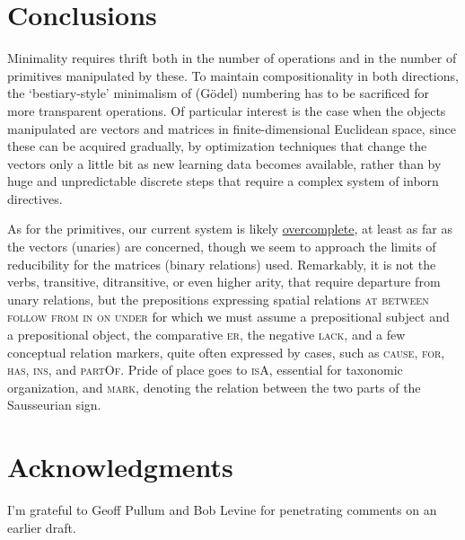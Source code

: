 \documentclass[output=paper,colorlinks=true,citecolor=brown]{langscibook}
\begin{document}
\section{Conclusions}

Minimality requires thrift both in the number of operations and in the number
of primitives manipulated by these. To maintain compositionality in both
directions, the `bestiary-style' minimalism of (Gödel) numbering has to be
sacrificed for more transparent operations. Of particular interest is the case
when the objects manipulated are vectors and matrices in finite-dimensional
Euclidean space, since these can be acquired gradually, by optimization
techniques that change the vectors only a little bit as new learning data
becomes available, rather than by huge and unpredictable discrete steps that
require a complex system of inborn directives.

As for the primitives, our current system is likely
\href{https://en.wikipedia.org/wiki/Overcompleteness}{overcomplete}, at least
as far as the vectors (unaries) are concerned, though we seem to approach the
limits of reducibility for the matrices (binary relations) used. Remarkably,
it is not the verbs, transitive, ditransitive, or even higher arity, that
require departure from unary relations, but the prepositions expressing
spatial relations \textsc{at between follow from in on under} for which we must
assume a prepositional subject and a prepositional object, the comparative
\textsc{er}, the negative \textsc{lack}, and a few conceptual relation markers,
quite often expressed by cases, such as \textsc{cause, for, has, ins}, and \textsc{partOf}. Pride of place goes to \textsc{isA}, essential for taxonomic
organization, and \textsc{mark}, denoting the relation between the two parts of
the Sausseurian sign.






\section*{Acknowledgments} I'm grateful to Geoff Pullum and Bob Levine for
penetrating comments on an earlier draft.

\sloppy
\printbibliography[heading=subbibliography,notkeyword=this]
\end{document}
